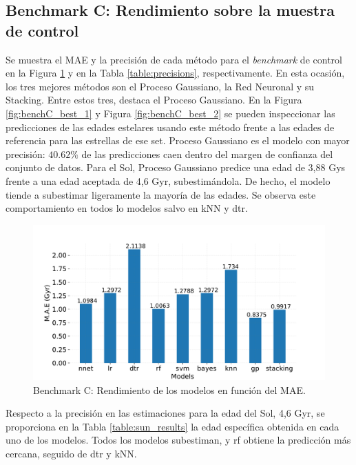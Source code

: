 \subsection{Benchmark C: Rendimiento sobre la muestra de control}

Se muestra el MAE y la precisión de cada método para el \emph{benchmark} de control en la Figura \ref{fig:benchC} y en la Tabla \ref{table:precisions}, respectivamente. En esta ocasión, los tres mejores métodos son el Proceso Gaussiano, la Red Neuronal y su Stacking. Entre estos tres, destaca el Proceso Gaussiano. En la Figura \ref{fig:benchC_best_1} y Figura \ref{fig:benchC_best_2} se pueden inspeccionar las predicciones de las edades estelares usando este método frente a las edades de referencia para las estrellas de ese set. Proceso Gaussiano es el modelo con mayor precisión: $40.62\%$ de las predicciones caen dentro del margen de confianza del conjunto de datos. Para el Sol, Proceso Gaussiano predice una edad de 3,88 Gys frente a una edad aceptada de 4,6 Gyr, subestimándola. De hecho, el modelo tiende a subestimar ligeramente la mayoría de las edades. Se observa este comportamiento en todos lo modelos salvo en kNN y dtr. 

\begin{figure}[H]
\begin{center}
 \includegraphics[width=0.8\linewidth]{Figuras/Experimentos/B_C_models.pdf}
\end{center}
\caption{Benchmark C: Rendimiento de los modelos en función del MAE.}
 \label{fig:benchC}
\end{figure}

Respecto a la precisión en las estimaciones para la edad del Sol, 4,6 Gyr, se proporciona en la Tabla \ref{table:sun_results} la edad específica obtenida en cada uno de los modelos. Todos los modelos subestiman, y rf obtiene la predicción más cercana, seguido de dtr y kNN.


